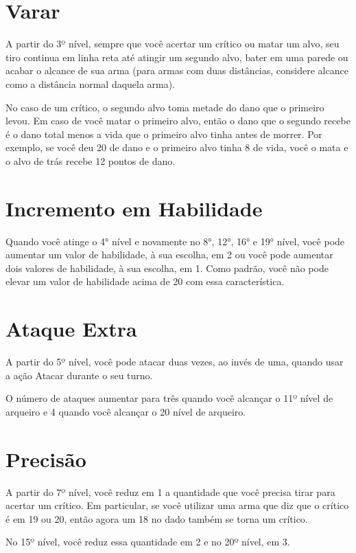 \documentclass{RPG_Adventure}[2021/10/20]
\begin{document}
\begin{multicols}{2}
\section*{Varar}%

A partir do 3º nível, sempre que você acertar um crítico ou matar um alvo, seu
tiro continua em linha reta até atingir um segundo alvo, bater em uma parede ou
acabar o alcance de sua arma (para armas com duas distâncias, considere alcance
como a distância normal daquela arma).

No caso de um crítico, o segundo alvo toma metade do dano que o primeiro levou.
Em caso de você matar o primeiro alvo, então o dano que o segundo recebe é o
dano total menos a vida que o primeiro alvo tinha antes de morrer. Por exemplo,
se você deu 20 de dano e o primeiro alvo tinha 8 de vida, você o mata e o alvo
de trás recebe 12 pontos de dano.

\section*{Incremento em Habilidade}%

Quando você atinge o 4° nível e novamente no 8°, 12°, 16° e 19° nível, você pode
aumentar um valor de habilidade, à sua escolha, em 2 ou você pode aumentar dois
valores de habilidade, à sua escolha, em 1. Como padrão, você não pode elevar um
valor de habilidade acima de 20 com essa característica.

\section*{Ataque Extra}%

A partir do 5º nível, você pode atacar duas vezes, ao invés de uma, quando usar
a ação Atacar durante o seu turno.

O número de ataques aumentar para três quando você alcançar o 11º nível de
arqueiro e 4 quando você alcançar o 20 nível de arqueiro.


\section*{Precisão}%

A partir do 7º nível, você reduz em 1 a quantidade que você precisa tirar para
acertar um crítico. Em particular, se você utilizar uma arma que diz que o
crítico é em 19 ou 20, então agora um 18 no dado também se torna um crítico.

No 15º nível, você reduz essa quantidade em 2 e no 20º nível, em 3.



\end{multicols}
\end{document}
